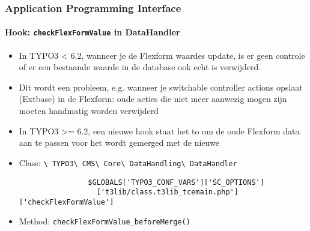 \begin{frame}[fragile]
	\frametitle{Application Programming Interface}
	\framesubtitle{Hook: \texttt{checkFlexFormValue} in DataHandler}

	\begin{itemize}
		\item In TYPO3 < 6.2, wanneer je de Flexform waardes update, is er geen controle of er een bestaande waarde in de database ook echt is verwijderd. 
		\item Dit wordt een probleem, e.g. wanneer je switchable controller actions opslaat (Extbase) in de Flexform: oude acties die niet meer aanwezig mogen zijn moeten handmatig worden verwijderd

		\item In TYPO3 >= 6.2, een nieuwe hook staat het to om de oude Flexform data aan te passen voor het wordt gemerged met de nieuwe
		\item Class:\newline
			\smaller
				\texttt{\textbackslash
					TYPO3\textbackslash
					CMS\textbackslash
					Core\textbackslash
					DataHandling\textbackslash
					DataHandler}\normalsize

			\lstset{
				basicstyle=\smaller\ttfamily
			}

			\begin{lstlisting}
				$GLOBALS['TYPO3_CONF_VARS']['SC_OPTIONS']
				  ['t3lib/class.t3lib_tcemain.php']['checkFlexFormValue']
			\end{lstlisting}

		\item Method:\newline
			\smaller
				\texttt{checkFlexFormValue\_beforeMerge()}

	\end{itemize}

\end{frame}



